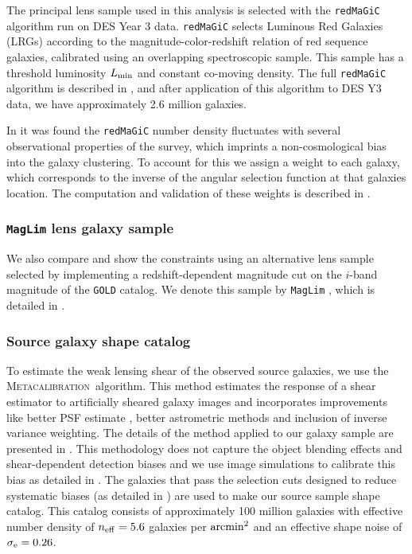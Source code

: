 \documentclass[fleqn,usenatbib]{mnras}
\newcommand{\redmagic}{\texttt{redMaGiC} }
\newcommand{\maglim}{\texttt{MagLim} }
\newcommand{\gold}{\texttt{GOLD} }
\newcommand{\metacal}{{\textsc{Metacalibration}~}}
\newcommand{\blue}[1]{\textcolor{blue}{#1}}
\begin{document}
The principal lens sample used in this analysis is selected with the \redmagic algorithm \citep{Rozo_2016} run on DES Year 3 data. \redmagic selects Luminous Red Galaxies (LRGs) according to the magnitude-color-redshift relation of red sequence galaxies, calibrated using an overlapping spectroscopic sample.
This sample has a threshold luminosity $L_{\rm min}$ and constant co-moving density. The full \redmagic algorithm is described in \citet{Rozo_2016}, and after application of this algorithm to DES Y3 data, we have approximately 2.6 million galaxies.


In \cite{y3-galaxyclustering} it was found the \redmagic number density fluctuates with several observational properties of the survey, which imprints a non-cosmological bias into the galaxy clustering. To account for this we assign a weight to each galaxy, which corresponds to the inverse of the angular selection function at that galaxies location. The computation and validation of these weights is described in \cite{y3-galaxyclustering}.  


\subsubsection{\maglim lens galaxy sample}
We also compare and show the constraints using an alternative lens sample selected by implementing a redshift-dependent magnitude cut on the $i$-band magnitude of the \gold catalog. We denote this sample by \maglim, which is detailed in \citet{y3-2x2ptaltlensresults}.


\subsubsection{Source galaxy shape catalog}

To estimate the weak lensing shear of the observed source galaxies, we use the \metacal algorithm. This method estimates the response of a shear estimator to artificially sheared galaxy images and incorporates improvements like better PSF estimate \citep{y3-piff}, better astrometric methods \citep{y3-gold} and inclusion of inverse variance weighting. The details of the method applied to our galaxy sample are presented in \cite{y3-shapecatalog}. This methodology does not capture the object blending effects and shear-dependent detection biases and we use image simulations to calibrate this bias as detailed in \citet{y3-imagesims}. The galaxies that pass the selection cuts designed to reduce systematic biases (as detailed in \citet{y3-shapecatalog}) are used to make our source sample shape catalog. This catalog consists of approximately 100 million galaxies with effective number density of $n_{\rm eff} = 5.6$ galaxies per ${\rm arcmin}^2$ and an effective shape noise of $\sigma_{\rm e} = 0.26$.
\end{document}
